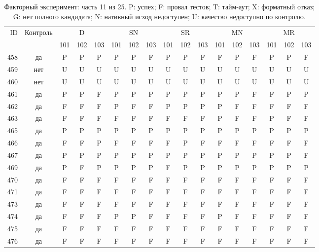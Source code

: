 \begin{table}[p]\centering\footnotesize
\setlength{\tabcolsep}{3pt}
\caption{Факторный эксперимент: часть 11 из 25. P: успех; F: провал тестов; T: тайм-аут; X: форматный отказ; G: нет полного кандидата; N: нативный исход недоступен; U: качество недоступно по контролю.}
\begin{tabular*}{\textwidth}{@{\extracolsep{\fill}}rcccccccccccccccc}\toprule
ID & Контроль & \multicolumn{3}{c}{D} & \multicolumn{3}{c}{SN} & \multicolumn{3}{c}{SR} & \multicolumn{3}{c}{MN} & \multicolumn{3}{c}{MR}\\
\cmidrule(lr){3-5}\cmidrule(lr){6-8}\cmidrule(lr){9-11}\cmidrule(lr){12-14}\cmidrule(lr){15-17}
 & & 101 & 102 & 103 & 101 & 102 & 103 & 101 & 102 & 103 & 101 & 102 & 103 & 101 & 102 & 103\\\midrule
458 & да & P & P & P & P & P & F & P & P & F & F & P & F & P & P & F\\
459 & нет & U & U & U & U & U & U & U & U & U & U & U & U & U & U & U\\
460 & нет & U & U & U & U & U & U & U & U & U & U & U & U & U & U & U\\
461 & да & P & P & F & P & P & P & P & P & P & P & P & F & F & P & P\\
462 & да & F & F & F & P & F & F & P & P & P & P & F & F & F & F & F\\
463 & да & F & F & F & F & F & F & F & F & F & P & F & F & P & F & F\\
465 & да & P & P & P & P & P & P & P & P & P & P & P & P & P & P & P\\
466 & да & F & F & P & F & F & F & F & P & F & F & F & F & F & F & F\\
467 & да & P & P & P & P & P & P & P & P & P & P & P & P & P & P & F\\
469 & да & P & F & P & P & P & P & F & P & P & P & P & P & P & P & P\\
470 & да & F & F & F & F & F & F & F & F & F & F & F & F & F & F & F\\
471 & да & F & F & F & F & F & F & F & F & F & F & F & F & F & F & F\\
473 & да & F & F & F & F & F & F & F & F & F & F & F & F & F & F & F\\
474 & да & F & F & F & P & P & F & F & F & F & P & F & F & F & F & F\\
475 & да & F & F & F & F & F & F & F & F & F & F & F & F & F & F & F\\
476 & да & F & F & F & F & F & F & F & F & F & F & F & F & F & F & F\\

\end{tabular*}
\end{table}
